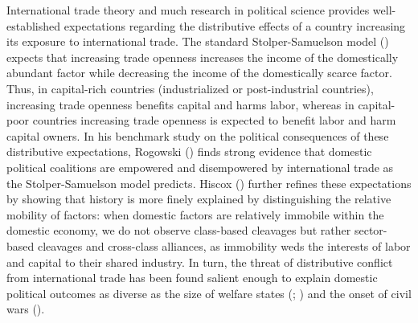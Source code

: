 \documentclass[12pt]{report}
\begin{document}
International trade theory and much research in political science provides well-established
expectations regarding the distributive effects of a country increasing its exposure to
international trade. The standard Stolper-Samuelson model (\citeyear{Stolper:1941vp}) expects that
increasing trade openness increases the income of the domestically abundant factor while decreasing
the income of the domestically scarce factor. Thus, in capital-rich countries (industrialized or
post-industrial countries), increasing trade openness benefits capital and harms labor, whereas in
capital-poor countries increasing trade openness is expected to benefit labor and harm capital
owners. In his benchmark study on the political consequences of these distributive expectations,
Rogowski (\citeyear{Rogowski:1989wm}) finds strong evidence that domestic political coalitions are
empowered and disempowered by international trade as the Stolper-Samuelson model predicts. Hiscox
(\citeyear{hiscox2002international}) further refines these expectations by showing that history is
more finely explained by distinguishing the relative mobility of factors: when domestic factors are
relatively immobile within the domestic economy, we do not observe class-based cleavages but rather
sector-based cleavages and cross-class alliances, as immobility weds the interests of labor and
capital to their shared industry. In turn, the threat of distributive conflict from international
trade has been found salient enough to explain domestic political outcomes as diverse as the size of
welfare states (\citealt{Cameron:1978vb}; \citealt{Burgoon:2001dp}) and the onset of civil wars
(\citealt{Bussmann:2007vx}).
\end{document}
